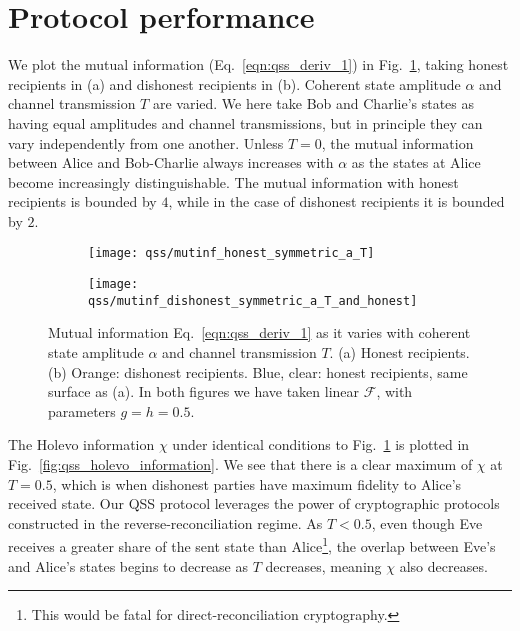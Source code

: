 \section{Protocol performance}\label{sec:qss_performance}


We plot the mutual information (Eq.~\ref{eqn:qss_deriv_1}) in Fig.~\ref{fig:qss_mutual_information}, taking honest recipients in (a) and dishonest recipients in (b). Coherent state amplitude $\alpha$ and channel transmission $T$ are varied. We here take Bob and Charlie's states as having equal amplitudes and channel transmissions, but in principle they can vary independently from one another. Unless $T=0$, the mutual information between Alice and Bob-Charlie always increases with $\alpha$ as the states at Alice become increasingly distinguishable. The mutual information with honest recipients is bounded by $4$, while in the case of dishonest recipients it is bounded by $2$. 

\begin{figure}[htp]
\captionsetup{width=\linewidth}
\centering
	\begin{subfigure}{0.49\linewidth}
	\centering
	\texttt{[image: qss/mutinf\_honest\_symmetric\_a\_T]}
	\caption{}
	\end{subfigure}
	\begin{subfigure}{0.49\linewidth}
	\centering
	\texttt{[image: qss/mutinf\_dishonest\_symmetric\_a\_T\_and\_honest]}
	\caption{}
	\end{subfigure}
\caption{\label{fig:qss_mutual_information} Mutual information Eq.~\ref{eqn:qss_deriv_1} as it varies with coherent state amplitude $\alpha$ and channel transmission $T$. (a) Honest recipients. (b) Orange: dishonest recipients. Blue, clear: honest recipients, same surface as (a). In both figures we have taken linear $\mathcal{F}$, with parameters $g = h = 0.5$.}
\end{figure}

The Holevo information $\chi$ under identical conditions to Fig.~\ref{fig:qss_mutual_information} is plotted in Fig.~\ref{fig:qss_holevo_information}. We see that there is a clear maximum of $\chi$ at $T = 0.5$, which is when dishonest parties have maximum fidelity to Alice's received state. Our QSS protocol leverages the power of cryptographic protocols constructed in the reverse-reconciliation regime. As $T < 0.5$, even though Eve receives a greater share of the sent state than Alice\footnote{This would be fatal for direct-reconciliation cryptography.}, the overlap between Eve's and Alice's states begins to decrease as $T$ decreases, meaning $\chi$ also decreases.

